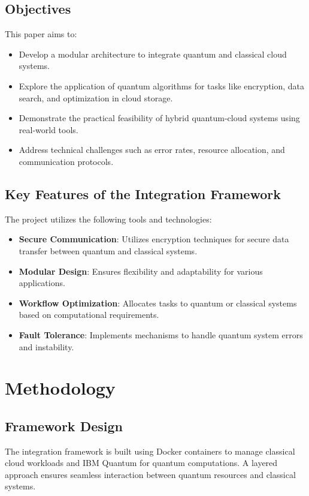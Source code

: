 \documentclass[12pt,a4paper]{article}
\begin{document}
\subsection{Objectives}
This paper aims to:
\begin{itemize}
   \item Develop a modular architecture to integrate quantum and classical cloud systems.
   \item Explore the application of quantum algorithms for tasks like encryption, data search, and optimization in cloud storage.
   \item Demonstrate the practical feasibility of hybrid quantum-cloud systems using real-world tools.
   \item Address technical challenges such as error rates, resource allocation, and communication protocols.
\end{itemize}

\subsection{Key Features of the Integration Framework}
The project utilizes the following tools and technologies:
\begin{itemize}
    \item \textbf{Secure Communication}: Utilizes encryption techniques for secure data transfer between quantum and classical systems.
    \item \textbf{Modular Design}: Ensures flexibility and adaptability for various applications.
    \item \textbf{Workflow Optimization}: Allocates tasks to quantum or classical systems based on computational requirements.
    \item \textbf{Fault Tolerance}: Implements mechanisms to handle quantum system errors and instability.
    
\end{itemize}

\section{Methodology}
\subsection{Framework Design}
The integration framework is built using Docker containers to manage classical cloud workloads and IBM Quantum for quantum computations. A layered approach ensures seamless interaction between quantum resources and classical systems.
\end{document}

